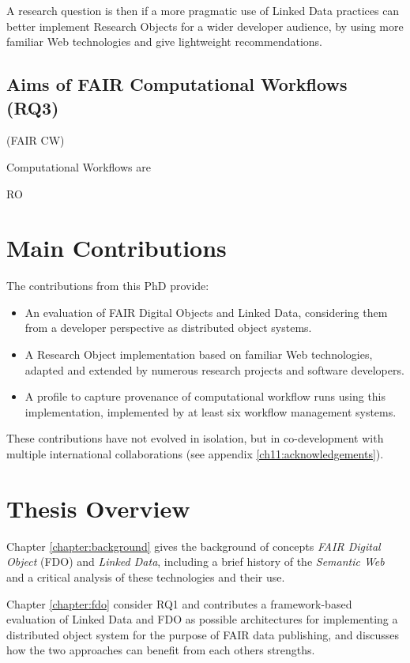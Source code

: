 A research question is then if a more pragmatic use of Linked Data practices can better implement Research Objects for a wider developer audience, by using more familiar Web technologies and give lightweight recommendations.


\subsection{Aims of FAIR Computational Workflows (RQ3)}

(FAIR CW)

Computational Workflows are 

RO 


\section{Main Contributions}

The contributions from this PhD provide:

\begin{itemize}
    \item An evaluation of FAIR Digital Objects and Linked Data, considering them from a developer perspective as distributed object systems.
    \item A Research Object implementation based on familiar Web technologies, adapted and extended by numerous research projects and software developers.
    \item A profile to capture provenance of computational workflow runs using this implementation, implemented by at least six workflow management systems.
\end{itemize}

These contributions have not evolved in isolation, but in co-development with multiple international collaborations (see appendix \vref{ch11:acknowledgements}).


\section{Thesis Overview}

Chapter \vref{chapter:background} gives the background of concepts \emph{FAIR Digital Object} (FDO) and \emph{Linked Data}, including a brief history of the \emph{Semantic Web} and a critical analysis of these technologies and their use. 

Chapter \vref{chapter:fdo} consider RQ1 and contributes a framework-based evaluation of Linked Data and FDO as possible architectures for implementing a distributed object system for the purpose of FAIR data publishing, and discusses how the two approaches can benefit from each others strengths. 

